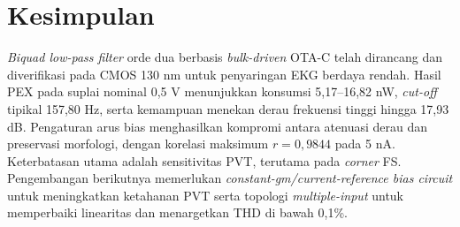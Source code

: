 \section{Kesimpulan}

\textit{Biquad low-pass filter} orde dua berbasis \textit{bulk-driven} OTA-C telah dirancang dan diverifikasi pada CMOS 130 nm untuk penyaringan EKG berdaya rendah. Hasil PEX pada suplai nominal 0,5 V menunjukkan konsumsi 5,17--16,82 nW, \textit{cut-off} tipikal 157,80 Hz, serta kemampuan menekan derau frekuensi tinggi hingga 17,93 dB. Pengaturan arus bias menghasilkan kompromi antara atenuasi derau dan preservasi morfologi, dengan korelasi maksimum $r=0{,}9844$ pada 5 nA. Keterbatasan utama adalah sensitivitas PVT, terutama pada \textit{corner} FS. Pengembangan berikutnya memerlukan \textit{constant-gm/current-reference bias circuit} untuk meningkatkan ketahanan PVT serta topologi \textit{multiple-input} untuk memperbaiki linearitas dan menargetkan THD di bawah 0,1\%.
